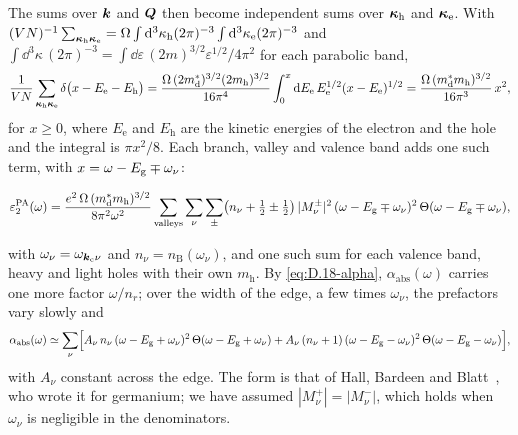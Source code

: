 The sums over $\bm{k}$ and $\bm{Q}$ then become independent sums over $\bm{\kappa}_{\mathrm{h}}$ and $\bm{\kappa}_{\mathrm{e}}$. With $(VN)^{-1}\sum_{\bm{\kappa}_{\mathrm{h}}\bm{\kappa}_{\mathrm{e}}} = \Omega\int\mathrm{d}^3\kappa_{\mathrm{h}}(2\pi)^{-3}\int\mathrm{d}^3\kappa_{\mathrm{e}}(2\pi)^{-3}$ and $\int\dd^3\kappa\,(2\pi)^{-3} = \int\dd\varepsilon\,(2m)^{3/2}\varepsilon^{1/2}/4\pi^2$ for each parabolic band,
\begin{equation*}
  \frac{1}{VN}\sum_{\bm{\kappa}_{\mathrm{h}}\bm{\kappa}_{\mathrm{e}}}\delta\bigl(x - E_{\mathrm{e}} - E_{\mathrm{h}}\bigr)
  = \frac{\Omega\,(2m^*_{\mathrm{d}})^{3/2}(2m_{\mathrm{h}})^{3/2}}{16\pi^4}\int_0^x\mathrm{d} E_{\mathrm{e}}\,E_{\mathrm{e}}^{1/2}(x - E_{\mathrm{e}})^{1/2}
  = \frac{\Omega\,(m^*_{\mathrm{d}}m_{\mathrm{h}})^{3/2}}{16\pi^3}\,x^2 ,
\end{equation*}
for $x \ge 0$, where $E_{\mathrm{e}}$ and $E_{\mathrm{h}}$ are the kinetic energies of the electron and the hole and the integral is $\pi x^2/8$. Each branch, valley and valence band adds one such term, with $x = \omega - E_{\mathrm{g}} \mp \omega_\nu$:
\begin{keyresult}
\begin{equation}
  \varepsilon_2^{\mathrm{PA}}(\omega) = \frac{e^2\,\Omega\,(m^*_{\mathrm{d}}m_{\mathrm{h}})^{3/2}}{8\pi^2\omega^2}\sum_{\text{valleys}}\sum_\nu\sum_\pm\bigl(n_\nu + \tfrac12 \pm \tfrac12\bigr)\,|M^{\pm}_\nu|^2\,(\omega - E_{\mathrm{g}} \mp \omega_\nu)^2\,\Theta(\omega - E_{\mathrm{g}} \mp \omega_\nu) ,
  \label{eq:D.18-HBB}
\end{equation}
\end{keyresult}
with $\omega_\nu = \omega_{\bm{k}_{\mathrm{c}}\nu}$ and $n_\nu = n_{\mathrm{B}}(\omega_\nu)$, and one such sum for each valence band, heavy and light holes with their own $m_{\mathrm{h}}$. By \cref{eq:D.18-alpha}, $\alpha_{\mathrm{abs}}(\omega)$ carries one more factor $\omega/n_r$; over the width of the edge, a few times $\omega_\nu$, the prefactors vary slowly and
\begin{equation}
  \alpha_{\mathrm{abs}}(\omega) \simeq \sum_\nu\Bigl[A_\nu\,n_\nu\,(\omega - E_{\mathrm{g}} + \omega_\nu)^2\,\Theta(\omega - E_{\mathrm{g}} + \omega_\nu) + A_\nu\,(n_\nu + 1)\,(\omega - E_{\mathrm{g}} - \omega_\nu)^2\,\Theta(\omega - E_{\mathrm{g}} - \omega_\nu)\Bigr] ,
  \label{eq:D.18-edge}
\end{equation}
with $A_\nu$ constant across the edge. The form is that of Hall, Bardeen and Blatt~\cite{hall1954infrared}, who wrote it for germanium; we have assumed $|M^+_\nu| = |M^-_\nu|$, which holds when $\omega_\nu$ is negligible in the denominators.

